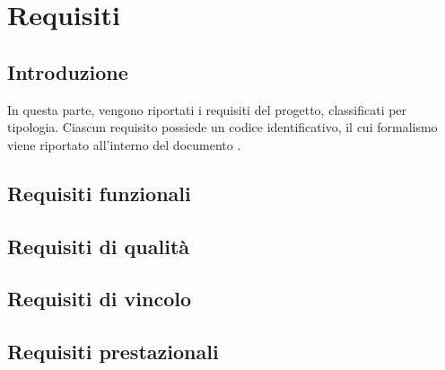 \section{Requisiti}\label{Requisiti}

\subsection{Introduzione}
In questa parte, vengono riportati i requisiti del progetto, classificati per tipologia. Ciascun requisito possiede un codice identificativo, il cui formalismo viene riportato all'interno del documento .

\subsection{Requisiti funzionali} \label{ReqFunz}


\subsection{Requisiti di qualità} \label{ReqQual}


\subsection{Requisiti di vincolo} \label{ReqVincolo}


\subsection{Requisiti prestazionali} \label{ReqPrest}

